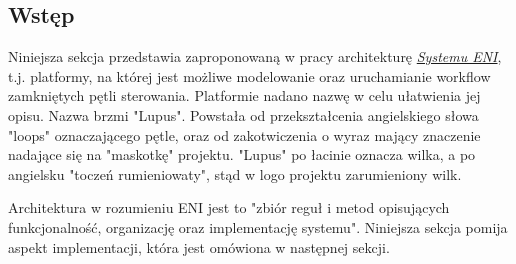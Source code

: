 \subsection{Wstęp}

Niniejsza sekcja przedstawia zaproponowaną w pracy architekturę \hyperlink{def:system-eni}{\textit{Systemu ENI}}, t.j. platformy, na której jest możliwe modelowanie oraz uruchamianie workflow zamkniętych pętli sterowania. Platformie nadano nazwę w celu ułatwienia jej opisu. Nazwa brzmi "Lupus". Powstała od przekształcenia angielskiego słowa "loops" oznaczającego pętle, oraz od zakotwiczenia o wyraz mający znaczenie nadające się na "maskotkę" projektu. "Lupus" po łacinie oznacza wilka, a po angielsku "toczeń rumieniowaty", stąd w logo projektu zarumieniony wilk. 

Architektura w rozumieniu ENI jest to "zbiór reguł i metod opisujących funkcjonalność, organizację oraz implementację systemu". Niniejsza sekcja pomija aspekt implementacji, która jest omówiona w następnej sekcji. 

